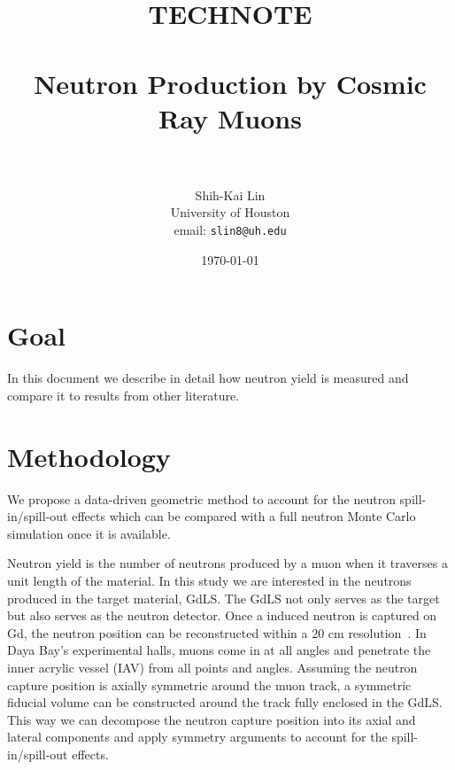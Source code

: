 \documentclass[paper=a4, fontsize=12pt, toc=left]{scrartcl} %
\title{	
\normalfont \normalsize 
\textsc{TECHNOTE} \\ [25pt] %
\horrule{0.5pt} \\[0.4cm] %
\huge Neutron Production by Cosmic Ray Muons \\ %
\horrule{2pt} \\[0.5cm] %
}
\author{Shih-Kai Lin \\
University of Houston \\
email: \small\texttt{slin8@uh.edu}} %
\date{\normalsize\today} %
\numberwithin{equation}{section} %
\numberwithin{figure}{section} %
\numberwithin{table}{section} %
\begin{document}
\maketitle %
\tableofcontents
\newpage


\section{Goal}

In this document we describe in detail how neutron yield is measured and compare it to results from other literature.



\section{Methodology}
We propose a data-driven geometric method to account for the neutron spill-in/spill-out effects which can be compared with a full neutron Monte Carlo simulation once it is available.

Neutron yield is the number of neutrons produced by a muon when it traverses a unit length of the material. In this study we are interested in the neutrons produced in the target material, GdLS. The GdLS not only serves as the target but also serves as the neutron detector. Once a induced neutron is captured on Gd, the neutron position can be reconstructed within a 20 cm resolution~\cite{docdb7334}. In Daya Bay's experimental halls, muons come in at all angles and penetrate the inner acrylic vessel (IAV) from all points and angles. Assuming the neutron capture position is axially symmetric around the muon track, a symmetric fiducial volume can be constructed around the track fully enclosed in the GdLS. This way we can decompose the neutron capture position into its axial and lateral components and apply symmetry arguments to account for the spill-in/spill-out effects.
\end{document}
